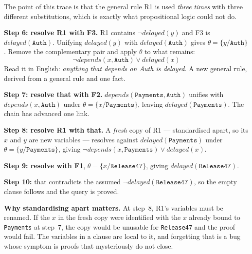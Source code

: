 \begin{worked}
The point of this trace is that the general rule R1 is used \emph{three times} with
three different substitutions, which is exactly what propositional logic could not
do.

\smallskip
\textbf{Step 6: resolve R1 with F3.} R1 contains
$\neg \mathit{delayed}(y)$ and F3 is $\mathit{delayed}(\texttt{Auth})$. Unifying
$\mathit{delayed}(y)$ with $\mathit{delayed}(\texttt{Auth})$ gives
$\theta = \{y/\texttt{Auth}\}$. Remove the complementary pair and apply $\theta$
to what remains:
\[
  \neg \mathit{depends}(x, \texttt{Auth}) \vee \mathit{delayed}(x)
\]
Read it in English: \emph{anything that depends on Auth is delayed}. A new general
rule, derived from a general rule and one fact.

\smallskip
\textbf{Step 7: resolve that with F2.} $\mathit{depends}(\texttt{Payments},
\texttt{Auth})$ unifies with $\mathit{depends}(x, \texttt{Auth})$ under
$\theta = \{x/\texttt{Payments}\}$, leaving
$\mathit{delayed}(\texttt{Payments})$. The chain has advanced one link.

\smallskip
\textbf{Step 8: resolve R1 with that.} A \emph{fresh} copy of R1 --- standardised
apart, so its $x$ and $y$ are new variables --- resolves against
$\mathit{delayed}(\texttt{Payments})$ under $\theta = \{y/\texttt{Payments}\}$,
giving $\neg \mathit{depends}(x, \texttt{Payments}) \vee \mathit{delayed}(x)$.

\smallskip
\textbf{Step 9: resolve with F1}, $\theta = \{x/\texttt{Release47}\}$, giving
$\mathit{delayed}(\texttt{Release47})$.

\smallskip
\textbf{Step 10:} that contradicts the assumed $\neg
\mathit{delayed}(\texttt{Release47})$, so the empty clause follows and the query is
proved.

\smallskip
\textbf{Why standardising apart matters.} At step~8, R1's variables must be
renamed. If the $x$ in the fresh copy were identified with the $x$ already bound to
\texttt{Payments} at step~7, the copy would be unusable for
\texttt{Release47} and the proof would fail. The variables in a clause are local to
it, and forgetting that is a bug whose symptom is proofs that mysteriously do not
close.
\end{worked}

